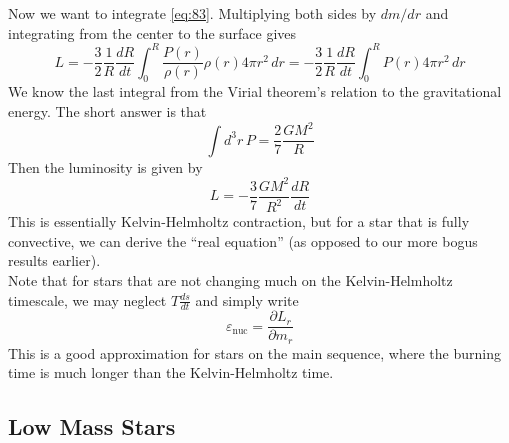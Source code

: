 \documentclass[10pt]{article}
\numberwithin{equation}{section}
\newcommand{\n}{\noindent}
\begin{document}
  \n Now we want to integrate \eqref{eq:83}. Multiplying both sides
  by $dm/dr$ and integrating from the center to the surface gives
  \begin{equation}
    \label{eq:85}
    L=-\frac{3}{2}\frac{1}{R}\frac{dR}{dt}\int_0^R\frac{P(r)}{\rho(r)}\rho
(r)4\pi
    r^2\,dr=-\frac{3}{2}\frac{1}{R}\frac{dR}{dt}\int_0^RP(r)4\pi r^2\,dr
  \end{equation}
  We know the last integral from the Virial theorem's relation to the
  gravitational energy. The short answer is that
  \begin{equation}
    \label{eq:86}
    \int d^3r\,P=\frac{2}{7}\frac{GM^2}{R}
  \end{equation}
  Then the luminosity is given by
  \begin{equation}
    \label{eq:87}
    L=-\frac{3}{7}\frac{GM^2}{R^2}\frac{dR}{dt}
  \end{equation}
  This is essentially Kelvin-Helmholtz contraction, but for a star
  that is fully convective, we can derive the ``real equation'' (as
  opposed to our more bogus results earlier).\\

  \n Note that for stars that are not changing much on the
  Kelvin-Helmholtz timescale, we may neglect $T\frac{ds}{dt}$ and
  simply write
  \begin{equation}
    \label{eq:147}
    \varepsilon_{\mathrm{nuc}}=\frac{\partial L_r}{\partial m_r}
  \end{equation}
  This is a good approximation for stars on the main sequence, where
  the burning time is much longer than the Kelvin-Helmholtz time.

  \subsection{Low Mass Stars}
  \label{sec:low-mass-stars}
\end{document}
